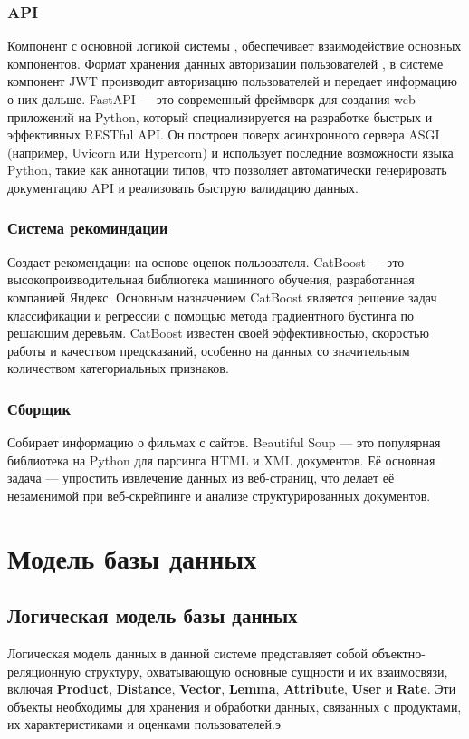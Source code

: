 \subsubsection{API}
Компонент с основной логикой системы , обеспечивает взаимодействие основных компонентов.
Формат хранения данных авторизации пользователей ,
в системе компонент JWT производит авторизацию пользователей и
передает информацию о них дальше.
FastAPI — это современный фреймворк для создания web-приложений на Python, который специализируется на разработке быстрых
и эффективных RESTful API. Он построен поверх асинхронного сервера ASGI (например, Uvicorn или Hypercorn) и использует последние возможности языка Python, такие как аннотации типов, что позволяет автоматически генерировать документацию API и реализовать быструю валидацию данных.
\subsubsection{Система рекоминдации}
Создает рекомендации на основе оценок пользователя.
CatBoost — это высокопроизводительная библиотека машинного обучения, разработанная компанией Яндекс.
Основным назначением CatBoost является решение задач классификации и регрессии с помощью метода градиентного бустинга по решающим деревьям.
CatBoost известен своей эффективностью, скоростью работы и качеством предсказаний, особенно на данных со значительным количеством категориальных признаков.
\subsubsection{Сборщик}
Собирает информацию о фильмах с сайтов.
Beautiful Soup — это популярная библиотека на Python для парсинга HTML и XML документов.
Её основная задача — упростить извлечение данных из веб-страниц, что делает её незаменимой при веб-скрейпинге и анализе структурированных документов.
\section{Модель базы данных}

\subsection{Логическая модель базы данных}


Логическая модель данных в данной системе представляет собой объектно-реляционную структуру,
охватывающую основные сущности и их взаимосвязи, включая \textbf{Product}, \textbf{Distance}, \textbf{Vector}, \textbf{Lemma}, \textbf{Attribute}, \textbf{User} и \textbf{Rate}.
Эти объекты необходимы для хранения и обработки данных, связанных с продуктами, их характеристиками и оценками пользователей.э

